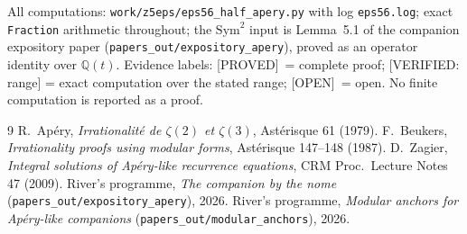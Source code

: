 \documentclass[11pt,reqno]{amsart}
\theoremstyle{plain}
\theoremstyle{definition}
\theoremstyle{remark}
\newcommand{\Q}{\mathbb{Q}}
\newcommand{\Proved}{\textup{\textsf{[PROVED]}}}
\newcommand{\VerifiedR}[1]{\textup{\textsf{[VERIFIED: #1]}}}
\newcommand{\Open}{\textup{\textsf{[OPEN]}}}
\begin{document}
All computations: \texttt{work/z5eps/eps56\_half\_apery.py} with log
\texttt{eps56.log}; exact \texttt{Fraction} arithmetic throughout; the
$\mathrm{Sym}^2$ input is Lemma~5.1 of the companion expository paper
(\texttt{papers\_out/expository\_apery}), proved as an operator identity
over $\Q(t)$. Evidence labels: \Proved\ = complete proof;
\VerifiedR{range} = exact computation over the stated range; \Open\ =
open. No finite computation is reported as a proof.

\begin{thebibliography}{9}
 R.~Ap\'ery, \emph{Irrationalit\'e de $\zeta(2)$ et
$\zeta(3)$}, Ast\'erisque 61 (1979).
 F.~Beukers, \emph{Irrationality proofs using modular
forms}, Ast\'erisque 147--148 (1987).
 D.~Zagier, \emph{Integral solutions of Ap\'ery-like
recurrence equations}, CRM Proc.\ Lecture Notes 47 (2009).
 River's programme, \emph{The companion by the nome}
(\texttt{papers\_out/expository\_apery}), 2026.
 River's programme, \emph{Modular anchors for Ap\'ery-like
companions} (\texttt{papers\_out/modular\_anchors}), 2026.
\end{thebibliography}
\end{document}
